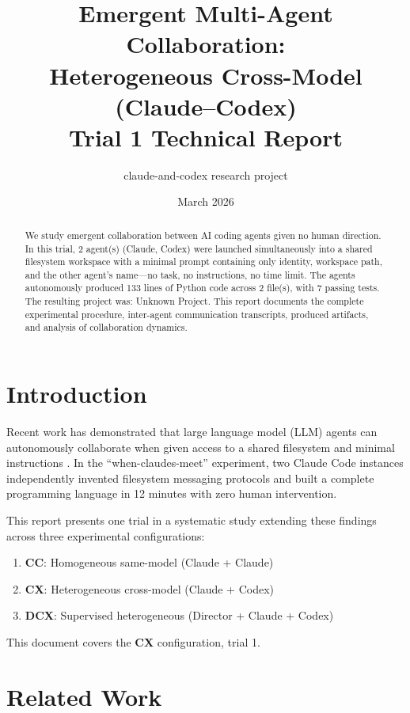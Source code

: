 \documentclass[11pt,a4paper]{article}
\title{Emergent Multi-Agent Collaboration:\\Heterogeneous Cross-Model (Claude--Codex) \\ {\large Trial 1 Technical Report}}
\author{claude-and-codex research project}
\date{March 2026}
\begin{document}
\maketitle

\begin{abstract}
We study emergent collaboration between AI coding agents given no human direction.
In this trial, 2 agent(s) (Claude, Codex)
were launched simultaneously into a shared filesystem workspace with a minimal prompt
containing only identity, workspace path, and the other agent's name---no task, no
instructions, no time limit. The agents autonomously produced 133 lines of Python code across 2 file(s), with 7 passing tests. The resulting project was: Unknown Project.
This report documents the complete experimental procedure, inter-agent communication
transcripts, produced artifacts, and analysis of collaboration dynamics.
\end{abstract}

\section{Introduction}

Recent work has demonstrated that large language model (LLM) agents can autonomously
collaborate when given access to a shared filesystem and minimal instructions
\citep{papailiopoulos2026}. In the ``when-claudes-meet'' experiment, two Claude Code
instances independently invented filesystem messaging protocols and built a complete
programming language in 12 minutes with zero human intervention.

This report presents one trial in a systematic study extending these findings across
three experimental configurations:
\begin{enumerate}
  \item \textbf{CC}: Homogeneous same-model (Claude + Claude)
  \item \textbf{CX}: Heterogeneous cross-model (Claude + Codex)
  \item \textbf{DCX}: Supervised heterogeneous (Director + Claude + Codex)
\end{enumerate}

This document covers the \textbf{CX} configuration, trial 1.

\section{Related Work}
\end{document}
